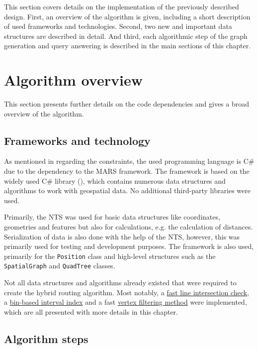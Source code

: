 
This section covers details on the implementation of the previously described design.
First, an overview of the algorithm is given, including a short description of used frameworks and technologies.
Second, two new and important data structures are described in detail.
And third, each algorithmic step of the graph generation and query answering is described in the main sections of this chapter.

\section{Algorithm overview}

	This section presents further details on the code dependencies and gives a broad overview of the algorithm.

	\subsection{Frameworks and technology}
	\label{subsec:frameworks-technology}
	
		As mentioned in  regarding the constraints, the used programming language is C\# due to the dependency to the MARS framework.
		The  framework is based on the widely used C\# library  (), which contains numerous data structures and algorithms to work with geospatial data.
		No additional third-party libraries were used.
		
		Primarily, the NTS was used for basic data structures like coordinates, geometries and features but also for calculations, e.g. the calculation of distances.
		Serialization of data is also done with the help of the NTS, however, this was primarily used for testing and development purposes.
		The  framework is also used, primarily for the \texttt{Position} class and high-level structures such as the \texttt{SpatialGraph} and \texttt{QuadTree} classes.
		
		Not all data structures and algorithms already existed that were required to create the hybrid routing algorithm.
		Most notably, a \hyperref[subsubsec:intersection-checks]{fast line intersection check}, a \hyperref[subsec:binindex]{bin-based interval index} and a fast \hyperref[subsec:shadow-areas]{vertex filtering method} were implemented, which are all presented with more details in this chapter.
			
	\subsection{Algorithm steps}
	\label{subsec:algorithm-steps}
	
